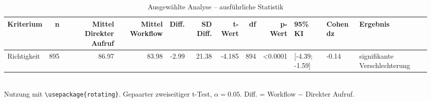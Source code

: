 \begin{table}
\centering
\caption{Ausgewählte Analyse -- ausführliche Statistik}
\begin{tabular}{lrrrrrrrrlll}
\toprule
Kriterium & n & Mittel Direkter Aufruf & Mittel Workflow & Diff. & SD Diff. & t-Wert & df & p-Wert & 95\% KI & Cohen dz & Ergebnis \\
\midrule
Richtigkeit & 895 & 86.97 & 83.98 & -2.99 & 21.38 & -4.185 & 894 & <0.0001 & [-4.39; -1.59] & -0.14 & signifikante Verschlechterung \\
\bottomrule
\end{tabular}
\\[2mm]
\footnotesize Nutzung mit \texttt{\textbackslash usepackage\{rotating\}}. Gepaarter zweiseitiger t-Test, $\alpha=0.05$. Diff. = Workflow $-$ Direkter Aufruf.
\end{table}
